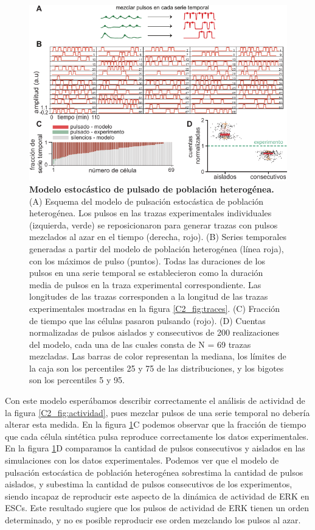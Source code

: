 \documentclass[./main.tex]{subfiles}
\begin{document}
 \begin{figure}
    \centering
    \includegraphics[width=1\columnwidth]{figures/chapter2/C2_pulsado_estocastico_heterog.pdf}\caption{\textbf{Modelo estocástico de pulsado de población heterogénea.}(A) Esquema del modelo de pulsación estocástica de población heterogénea. Los pulsos en las trazas experimentales individuales (izquierda, verde) se reposicionaron para generar trazas con pulsos mezclados al azar en el tiempo (derecha, rojo). (B) Series temporales generadas a partir del modelo de población heterogénea (línea roja), con los máximos de pulso (puntos). Todas las duraciones de los pulsos en una serie temporal se establecieron como la duración media de pulsos en la traza experimental correspondiente. Las longitudes de las trazas corresponden a la longitud de las trazas experimentales mostradas en la figura \ref{C2_fig:traces}. (C) Fracción de tiempo que las células pasaron pulsando (rojo). (D) Cuentas normalizadas de pulsos aislados y consecutivos de 200 realizaciones del modelo, cada una de las cuales consta de N = 69 trazas mezcladas. Las barras de color representan la mediana, los límites de la caja son los percentiles 25 y 75 de las distribuciones, y los bigotes son los percentiles 5 y 95. }
    \label{C2_fig:pulsos_estocasticos_heterog}
\end{figure}


Con este modelo esperábamos describir correctamente el análisis de actividad de la figura \ref{C2_fig:actividad}, pues mezclar pulsos de una serie temporal no debería alterar esta medida. En la figura \ref{C2_fig:pulsos_estocasticos_heterog}C podemos observar que la fracción de tiempo que cada célula sintética pulsa reproduce correctamente los datos experimentales. En la figura  \ref{C2_fig:pulsos_estocasticos_heterog}D comparamos la cantidad de pulsos consecutivos y aislados en las simulaciones con los datos experimentales. Podemos ver que el modelo de pulsación estocástica de población heterogénea sobrestima la cantidad de pulsos aislados, y subestima la cantidad de pulsos consecutivos de los experimentos, siendo incapaz de reproducir este aspecto de la dinámica de actividad de ERK en ESCs. Este resultado sugiere que los pulsos de actividad de ERK tienen un orden determinado, y no es posible reproducir ese orden mezclando los pulsos al azar.
\end{document}
